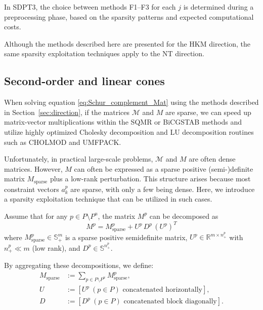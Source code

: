 In SDPT3, the choice between methods F1--F3 for each $j$ is determined during a preprocessing phase, based on the sparsity patterns and expected computational costs.

Although the methods described here are presented for the HKM direction, the same sparsity exploitation techniques apply to the NT direction.


\subsection{Second-order and linear cones} \label{sec:exploit_sparsity_socp_lp}
When solving equation \eqref{eq:Schur_complement_Mat} using the methods described in Section~\ref{sec:direction},
if the matrices $\mathcal{M}$ and $M$ are sparse, we can speed up matrix-vector multiplications within the SQMR or BiCGSTAB methods and utilize highly optimized Cholesky decomposition and LU decomposition routines such as CHOLMOD and UMFPACK.

Unfortunately, in practical large-scale problems, $\mathcal{M}$ and $M$ are often dense matrices. 
However, $M$ can often be expressed as a sparse positive (semi-)definite matrix $M_{\mathrm{sparse}}$ plus a low-rank perturbation.
This structure arises because most constraint vectors $a^p_k$ are sparse, with only a few being dense.
Here, we introduce a sparsity exploitation technique that can be utilized in such cases.

Assume that for any $p\in P\setminus P^u$, the matrix $M^p$ can be decomposed as
\begin{equation}
  M^p = M^p_{\mathrm{sparse}} + U^p\, D^p\, (U^p)^T
  \label{eq:low_rank_perturbation}
\end{equation}
where $M^p_{\mathrm{sparse}} \in \mathbb{S}^m_+$ is a sparse positive semidefinite matrix, 
$U^p \in \mathbb{R}^{m\times n^p_+}$ with $n^p_+ \ll m$ (low rank), 
and $D^p\in \mathbb{S}^{n^p_+}$.

By aggregating these decompositions, we define:
\begin{align}
  M_{\mathrm{sparse}} &:= \sum_{p\in P\setminus P^u} M^p_{\mathrm{sparse}}, \\
  U &:= [U^p ~ (p\in P) \text{ concatenated horizontally}], \\
  D &:= [D^p ~ (p\in P) \text{ concatenated block diagonally}].
\end{align}

